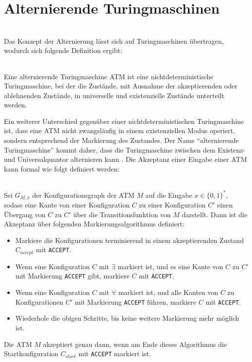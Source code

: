 \section{Alternierende Turingmaschinen} \label{section: alternierende Turingmaschine} \\
Das Konzept der Alternierung lässt sich auf Turingmaschinen übertragen, wodurch sich folgende Definition ergibt:
\begin{definition}\cite[S.409]{sipser_introduction_2012} \\
    Eine alternierende Turingmaschine ATM ist eine nichtdeterministische Turingmaschine, bei der die Zustände, mit Ausnahme der akzeptierenden oder ablehnenden Zustände,
    in universelle und existenzielle Zustände unterteilt werden.
\end{definition}

Ein weiterer Unterschied gegenüber einer nichtdeterministischen Turingmaschine ist, dass eine ATM nicht zwangsläufig in einem existenziellen Modus operiert, sondern entsprechend der Markierung des Zustandes.
Der Name \enquote{alternierende Turingmaschine} kommt daher, dass die Turingmaschine zwischen dem Existenz- und Universalquantor alternieren kann \cite{chandra_alternation_1976}.
Die Akzeptanz einer Eingabe einer ATM kann formal wie folgt definiert werden:
\begin{definition}\cite[S.99-100]{arora_computational_2009} \\
    Sei $G_{M, x}$ der Konfigurationsgraph der ATM $M$ auf die Eingabe $x \in \{0,1\}^*$, sodass eine Kante von einer Konfiguration $C$ zu 
    einer Konfiguration $C'$ einen Übergang von $C$ zu $C'$ über die Transitionsfunktion von $M$ darstellt. Dann ist die Akzeptanz über folgenden
    Markierungsalgorithmus definiert:

    \begin{itemize}
        \item Markiere die Konfigurationen terminierend in einem akzeptierenden Zustand $C_{accept}$ mit \texttt{ACCEPT}.
    \end{itemize}
    \begin{itemize}        
        \item Wenn eine Konfiguration $C$ mit $\exists$ markiert ist, und es eine Kante von $C$ zu $C'$ mit Markierung \texttt{ACCEPT} gibt, markiere $C$ mit \texttt{ACCEPT}.
        \item Wenn eine Konfiguration $C$ mit $\forall$ markiert ist, und alle Kanten von $C$ zu Konfigurationen $C'$ mit Markierung \texttt{ACCEPT} führen, markiere $C$ mit \texttt{ACCEPT}.
        \item Wiederhole die obigen Schritte, bis keine weitere Markierung mehr möglich ist.
    \end{itemize}

    Die ATM $M$ akzeptiert genau dann, wenn am Ende dieses Algorithmus die Startkonfiguration $C_{start}$ mit \texttt{ACCEPT} markiert ist.
\end{definition}
